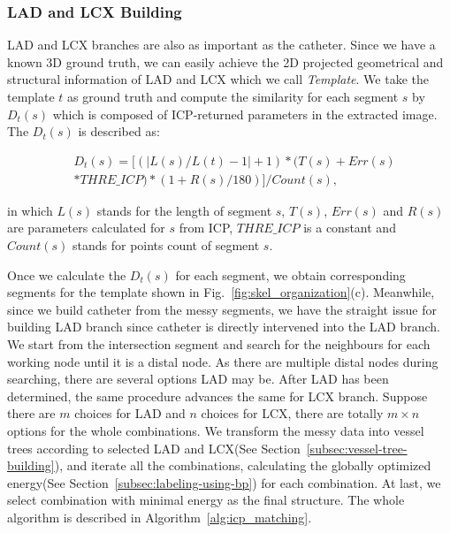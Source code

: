 \documentclass[journal]{IEEEtran}
\begin{document}
\subsubsection{\textbf{LAD and LCX Building}}
LAD and LCX branches are also as important as the catheter. Since we have a known 3D ground truth, we can easily achieve the 2D projected geometrical and structural information of LAD and LCX which we call \textit{Template}. We take the template $t$ as ground truth and compute the similarity for each segment $s$ by $D_t(s)$ which is composed of ICP-returned parameters in the extracted image. The $D_t(s)$ is described as:

\begin{equation}
\label{eq:dp_fp}
\begin{split}
&D_t(s) = [(|L(s)/L(t)-1|+1)*(T(s)+Err(s)\\
&*THRE\_ICP)*(1+R(s)/180)]/Count(s),
\end{split}
\end{equation}

in which $L(s)$ stands for the length of segment $s$, $T(s)$, $Err(s)$ and $R(s)$ are parameters calculated for $s$ from ICP, $THRE\_ICP$ is a constant and $Count(s)$ stands for points count of segment $s$.

Once we calculate the $D_t(s)$ for each segment, we obtain corresponding segments for the template shown in Fig.~\ref{fig:skel_organization}(c). Meanwhile, since we build catheter from the messy segments, we have the straight issue for building LAD branch since catheter is directly intervened into the LAD branch. We start from the intersection segment and search for the neighbours for each working node until it is a distal node. As there are multiple distal nodes during searching, there are several options LAD may be. After LAD has been determined, the same procedure advances the same for LCX branch. Suppose there are $m$ choices for LAD and $n$ choices for LCX, there are totally $m \times n$ options for the whole combinations. We transform the messy data into vessel trees according to selected LAD and LCX(See Section~\ref{subsec:vessel-tree-building}), and iterate all the combinations, calculating the globally optimized energy(See Section~\ref{subsec:labeling-using-bp}) for each combination. At last, we select combination with minimal energy as the final structure. The whole algorithm is described in Algorithm~\ref{alg:icp_matching}.
\end{document}
